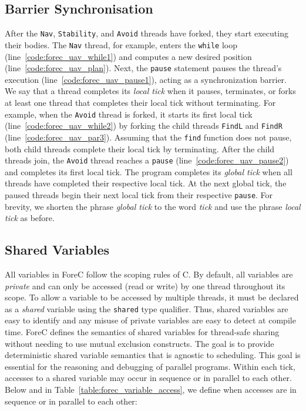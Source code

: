 
\subsection{Barrier Synchronisation}
After the \verb$Nav$, \verb$Stability$, and \verb$Avoid$
threads have forked, they start executing their bodies.
The \verb$Nav$ thread, for example, enters the \verb$while$
loop (line~\ref{code:forec_uav_while1}) and computes a new
desired position (line~\ref{code:forec_uav_plan}). Next, the
\verb$pause$ statement pauses the thread's execution 
(line~\ref{code:forec_uav_pause1}), acting as a
synchronization barrier. We say that a thread completes its
\emph{local tick} when it pauses, terminates, or forks at
least one thread that completes their local tick without
terminating. For example, when the \verb$Avoid$ thread is 
forked, it starts its first local tick (line~\ref{code:forec_uav_while2}) 
by forking the child threads \verb$FindL$ and \verb$FindR$ 
(line~\ref{code:forec_uav_par3}). Assuming that the \verb$find$ 
function does not pause, both child threads complete their 
local tick by terminating. After the child threads join, 
the \verb$Avoid$ thread reaches a \verb$pause$ (line~\ref{code:forec_uav_pause2})
and completes its first local tick.
The program completes its \emph{global tick}
when all threads have completed their respective local tick. At the
next global tick, the paused threads begin their
next local tick from their respective \verb$pause$. 
For brevity, we shorten the phrase \emph{global
tick} to the word \emph{tick} and use the phrase \emph{local
tick} as before.



\subsection{Shared Variables}
\label{sec:forec_shared_variables}
All variables in ForeC follow the scoping rules of C. By
default, all variables are \emph{private} and can only be
accessed (read or write) by one thread throughout its scope.
To allow a variable to be accessed by multiple threads, it
must be declared as a \emph{shared} variable using the
\verb$shared$ type qualifier. Thus, shared variables are
easy to identify and any misuse of private variables are
easy to detect at compile time. ForeC defines the semantics
of shared variables for thread-safe sharing without needing
to use mutual exclusion constructs. The goal is to provide
deterministic shared variable semantics that is agnostic to
scheduling. This goal is essential for the reasoning and
debugging of parallel programs. Within each tick, accesses
to a shared variable may occur in sequence or in parallel to
each other. Below and in
Table~\ref{table:forec_variable_access}, we define when
accesses are in sequence or in parallel to each other:

